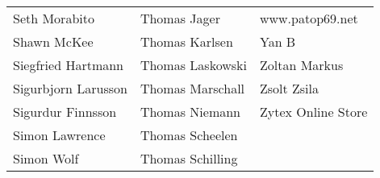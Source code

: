 \begin{small}
\begin{tabular}{p{4cm}p{4cm}p{4cm}}
Seth Morabito & Thomas Jager & www.patop69.net \\
Shawn McKee & Thomas Karlsen & Yan B \\
Siegfried Hartmann & Thomas Laskowski & Zoltan Markus \\
Sigurbjorn Larusson & Thomas Marschall & Zsolt Zsila \\
Sigurdur Finnsson & Thomas Niemann & Zytex Online Store \\
Simon Lawrence & Thomas Scheelen &  \\
Simon Wolf & Thomas Schilling &  \\
\end{tabular}
\end{small}
